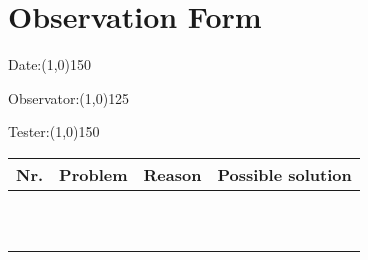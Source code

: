 \chapter{Observation Form}


\indent

Date:\line(1,0){150}
\vspace{5mm}

Observator:\line(1,0){125}
\vspace{5mm}

Tester:\line(1,0){150}
\vspace{5mm}

\begin{table}[h]
	\centering
	\begin{tabular}{| l | p{4cm} | p{4cm} | p{4cm} |}
	\hline
	{\bf Nr.} & {\bf Problem} & {\bf Reason} & {\bf Possible solution} \\ \hline
	& & & \\[1cm] \hline
	& & & \\[1cm] \hline 
	& & & \\[1cm] \hline 
	& & & \\[1cm] \hline 
	& & & \\[1cm] \hline 
	& & & \\[1cm] \hline
	& & & \\[1cm] \hline 
	& & & \\[1cm] \hline 
	& & & \\[1cm] \hline 
	& & & \\[1cm] \hline 
	\end{tabular}
\end{table}